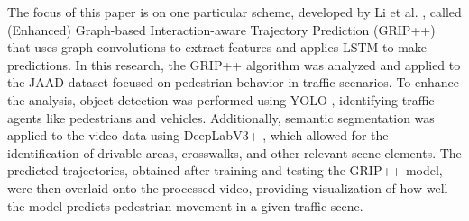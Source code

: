\tab The focus of this paper is on one particular scheme, developed by Li et al. \cite{li2020gripplus}, called (Enhanced) Graph-based Interaction-aware Trajectory Prediction (GRIP++) that uses graph convolutions to extract features and applies LSTM to make predictions. In this research, the GRIP++ algorithm was analyzed and applied to the JAAD dataset \cite{rasouli2017ICCVW} focused on pedestrian behavior in traffic scenarios. To enhance the analysis, object detection was performed using YOLO \cite{yolov3}, identifying traffic agents like pedestrians and vehicles. Additionally, semantic segmentation was applied to the video data using DeepLabV3+ \cite{DBLP:journals/corr/abs-1802-02611}, which allowed for the identification of drivable areas, crosswalks, and other relevant scene elements. The predicted trajectories, obtained after training and testing the GRIP++ model, were then overlaid onto the processed video, providing visualization of how well the model predicts pedestrian movement in a given traffic scene.





